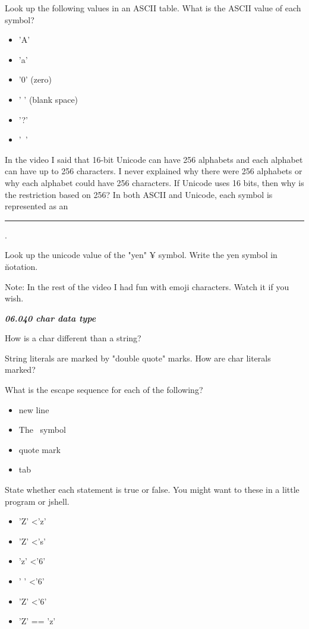 \documentclass[letterpaper,11pt]{exam}
\newcommand{\videoheading}[1]{\Large\textbf{\textit{#1}}}
\begin{document}
\begin{questions}
\question Look up the following values in an ASCII table.  What is the ASCII value of each symbol?
\begin{itemize}
  \item 'A'
  \item 'a'
  \item '0' (zero)
  \item ' ' (blank space)
  \item '?'
  \item '~'
\end{itemize}
\question In the video I said that 16-bit Unicode can have 256 alphabets and each alphabet can have up to 256 characters.  I never explained why there were 256 alphabets or why each alphabet could have 256 characters.  If Unicode uses 16 bits, then why is the restriction based on 256?
\vspace{1cm}
\question In both ASCII and Unicode, each symbol is represented as an \rule{2cm}{0.15mm}.

\question Look up the unicode value of the "yen" ¥ symbol.  Write the yen symbol in \u notation.  
\vspace{.5cm}

Note:  In the rest of the video I had fun with emoji characters.  Watch it if you wish.  

\videoheading{06.040 char data type}

\question How is a char different than a string?
\vspace{1cm}

\question String literals are marked by "double quote" marks.  How are char literals marked?

\question What is the escape sequence for each of the following?
\begin{itemize}
  \item new line
  \item The \ symbol
  \item quote mark
  \item tab
\end{itemize}
\question State whether each statement is true or false.  You might want to these in a little program or jshell.
\begin{itemize}
  \item 'Z' \textless 'z'
  \item 'Z' \textless 's'
  \item 'z' \textless '6' 
  \item ' ' \textless '6'
  \item 'Z' \textless '6'
  \item 'Z' == 'z'
\end{itemize}


\end{questions}
\end{document}
